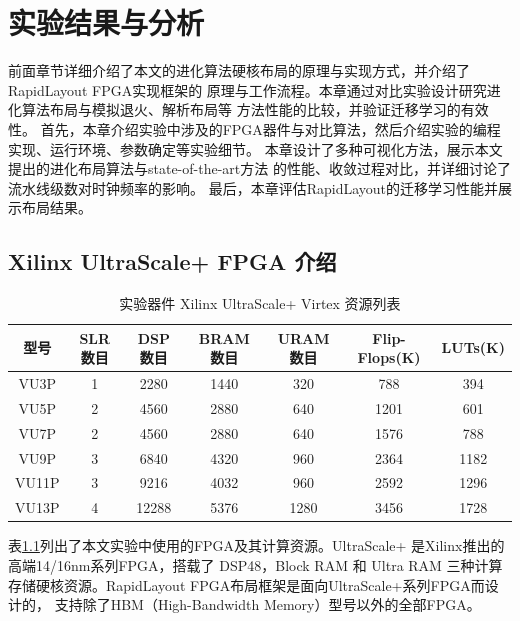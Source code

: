 \chapter{实验结果与分析}

前面章节详细介绍了本文的进化算法硬核布局的原理与实现方式，并介绍了RapidLayout FPGA实现框架的
原理与工作流程。本章通过对比实验设计研究进化算法布局与模拟退火、解析布局等
方法性能的比较，并验证迁移学习的有效性。
首先，本章介绍实验中涉及的FPGA器件与对比算法，然后介绍实验的编程实现、运行环境、参数确定等实验细节。
本章设计了多种可视化方法，展示本文提出的进化布局算法与state-of-the-art方法
的性能、收敛过程对比，并详细讨论了流水线级数对时钟频率的影响。
最后，本章评估RapidLayout的迁移学习性能并展示布局结果。

\section{Xilinx UltraScale+ FPGA 介绍}

\begin{table}[h]
	\centering
	\caption{实验器件 Xilinx UltraScale+ Virtex 资源列表}		
	\label{tab:fpg}
	\begin{tabular}{c|c c c c c c}
		\toprule[2pt]
        型号 	& SLR数目 & DSP 数目 & BRAM 数目 & URAM 数目 & Flip-Flops(K) & LUTs(K)	\\
        \midrule[2pt]
        VU3P   & 1       & 2280    & 1440     & 320       & 788               & 394 \\
        \hline 
        VU5P   & 2       & 4560    & 2880     & 640       & 1201              & 601 \\
        \hline
        VU7P   & 2       & 4560    & 2880     & 640       & 1576              & 788 \\
        \hline
        VU9P   & 3       & 6840    & 4320     & 960       & 2364              & 1182 \\
        \hline
        VU11P  & 3       & 9216    & 4032     & 960       & 2592              & 1296 \\
        \hline 
        VU13P  & 4       & 12288   & 5376     & 1280      & 3456              & 1728 \\
        \bottomrule[2pt]
	\end{tabular}
\end{table}

表\ref{tab:fpg}列出了本文实验中使用的FPGA及其计算资源。UltraScale+ 是Xilinx推出的高端14/16nm系列FPGA，搭载了
DSP48，Block RAM 和 Ultra RAM 三种计算存储硬核资源。RapidLayout FPGA布局框架是面向UltraScale+系列FPGA而设计的，
支持除了HBM（High-Bandwidth Memory）型号以外的全部FPGA。

